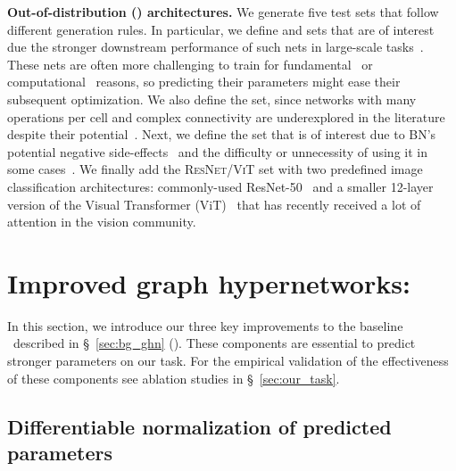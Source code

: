 \textbf{Out-of-distribution (\ood) architectures.}
We generate five \ood test sets that follow different generation rules.
In particular, we define \wide and \deep sets that are of interest due the stronger downstream performance of such nets in large-scale tasks~\citep{golubeva2020wider,zagoruyko2016wide,brown2020language}. These nets are often more challenging to train for fundamental~\citep{nguyen2017loss,srivastava2015training} or computational~\citep{hooker2020hardware} reasons, so predicting their parameters might ease their subsequent optimization.
We also define the \dense set, since networks with many operations per cell and complex connectivity are underexplored in the literature despite their potential~\citep{huang2017densely}.
Next, we define the \bnfree set that is of interest due to BN's potential negative side-effects~\citep{galloway2019batch,hendrycks2019benchmarking} and the difficulty or unnecessity of using it in some cases~\citep{wu2018group,qiao2019micro,zhang2019fixup,brock2021characterizing,brock2021high}. 
We finally add the \textsc{ResNet/ViT} set with two predefined image classification architectures: commonly-used ResNet-50~\citep{he2016deep} and a smaller 12-layer version of the Visual Transformer (ViT)~\citep{dosovitskiy2020image} that has recently received a lot of attention in the vision community.
	
\section{Improved graph hypernetworks: \ghnours\label{sec:ghn_model}}

In this section, we introduce our three key improvements to the baseline \ghnbase~described in \S~\ref{sec:bg_ghn} (\fig{\ref{fig:ghn_overview}}).
These components are essential to predict stronger parameters on our task. For the empirical validation of the effectiveness of these components see ablation studies in \S~\ref{sec:our_task}.

\subsection{Differentiable normalization of predicted parameters\label{sec:renorm}}


